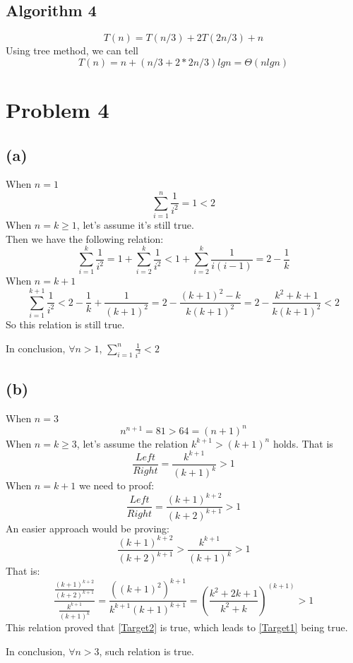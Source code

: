 \documentclass{article}
\begin{document}
	\subsection*{Algorithm 4}
		$$T(n) = T(n/3) + 2T(2n/3) + n$$
		Using tree method, we can tell
		$$T(n) = n + (n/3+2*2n/3)lg n = \Theta(n lg n)$$

\section*{Problem 4}
	\subsection*{(a)}
		When $ n = 1$
			$$ \sum_{i=1}^n\frac{1}{i^2} = 1 < 2$$
		When $n = k \geqslant 1 $, let's assume it's still true.\\
		Then we have the following relation:
			$$ \sum_{i=1}^k\frac{1}{i^2} 
			= 1 + \sum_{i=2}^k\frac{1}{i^2} 
			< 1 + \sum_{i=2}^k\frac{1}{i(i-1)} 
			= 2 - \frac{1}{k}
			$$
		When $n = k+1$
		$$ \sum_{i=1}^{k+1}\frac{1}{i^2} 
			< 2 - \frac{1}{k} + \frac{1}{(k+1)^2}
			= 2 - \frac{(k+1)^2 - k}{k(k+1)^2}
			= 2 - \frac{k^2 + k + 1}{k(k+1)^2}
			< 2
		$$
		So this relation is still true.
		\par In conclusion, $\forall n > 1$, $\sum_{i=1}^n\frac{1}{i^2} < 2$


	\subsection*{(b)}
		When $ n = 3 $
			$$ n^{n+1} = 81 > 64 = (n+1)^n$$
		When $ n = k \geqslant 3 $, let's assume the relation $ k^{k+1} > (k+1) ^ n$ holds. That is
		$$ \frac{Left}{Right}
			= \frac{k^{k+1}}{(k+1)^k}
			> 1
		$$
		When $ n = k + 1 $ we need to proof:
		\begin{equation} \label{Target1} 
		\frac{Left}{Right} 
				= \frac{(k+1)^{k+2}}{(k+2)^{k+1}}
				> 1
		\end{equation}
		An easier approach would be proving:
		\begin{equation} \label{Target2}
		\frac{(k+1)^{k+2}}{(k+2)^{k+1}} 
			> \frac{k^{k+1}}{(k+1)^k}
			> 1
		\end{equation}
		That is:
		$$ \frac{\frac{(k+1)^{k+2}}{(k+2)^{k+1}}}{\frac{k^{k+1}}{(k+1)^k}}
			= \frac{((k+1)^2)^{k+1}}{k^{k+1}(k+1)^{k+1}}
			= (\frac{k^2+2k+1}{k^2+k})^{(k+1)}
			> 1
		$$
		This relation proved that \ref{Target2} is true, which leads to \ref{Target1} being true.
		\par In conclusion, $\forall n > 3$, such relation is true.
\end{document}
